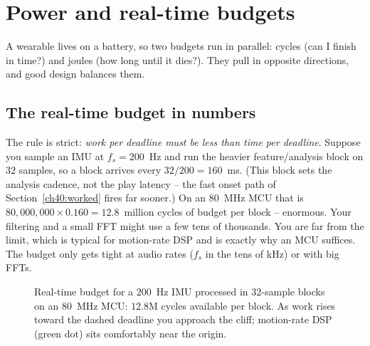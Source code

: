 \section{Power and real-time budgets}
\label{ch40:budgets}

A wearable lives on a battery, so two budgets run in parallel: cycles (can I finish in time?) and
joules (how long until it dies?). They pull in opposite directions, and good design balances them.

\subsection{The real-time budget in numbers}

The rule is strict: \emph{work per deadline must be less than time per deadline}. Suppose you
sample an IMU at $f_s = 200$~Hz and run the heavier feature/analysis block on $32$ samples, so a
block arrives every $32/200 = 160$~ms. (This block sets the analysis cadence, not the play latency
-- the fast onset path of Section~\ref{ch40:worked} fires far sooner.) On an $80$~MHz MCU that is
$80{,}000{,}000 \times 0.160 = 12.8$~million cycles of budget per block -- enormous. Your filtering and a small FFT might use a few tens of thousands.
You are far from the limit, which is typical for motion-rate DSP and is exactly why an MCU
suffices. The budget only gets tight at audio rates ($f_s$ in the tens of kHz) or with big FFTs.

\begin{figure}[H]
\centering
{}
\caption{Real-time budget for a $200$~Hz IMU processed in $32$-sample blocks on an $80$~MHz MCU:
$12.8$M cycles available per block. As work rises toward the dashed deadline you approach the
cliff; motion-rate DSP (green dot) sits comfortably near the origin.}
\label{ch40:fig-budget}
\end{figure}

